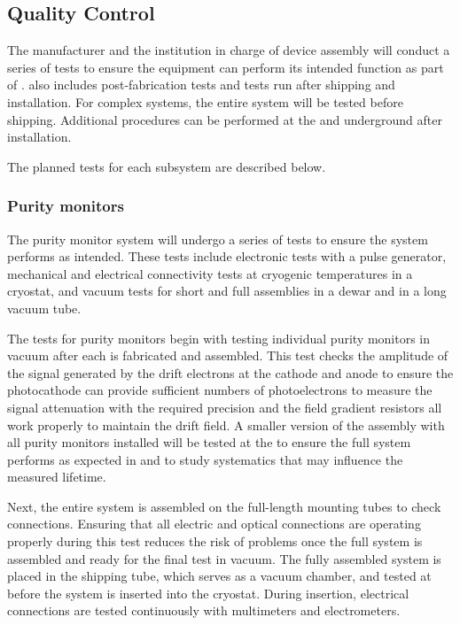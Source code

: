 \subsection{Quality Control}
\label{sec:fdsp-slow-cryo-qc}
The manufacturer and the institution in charge of device assembly will conduct a series of tests to ensure the equipment can perform its intended function as part of .  also includes post-fabrication tests and tests run after shipping and installation. For complex systems, the entire system will be tested before shipping. 
Additional  procedures can be performed at the  and underground after installation. %

The planned tests for each subsystem are described below.  


\subsubsection{Purity monitors}
\label{sec:fdgen-slow-cryo-qc-pm}


The purity monitor system will undergo a series of tests to ensure the
system performs as intended. These tests 
include electronic tests
with a pulse generator, mechanical and electrical connectivity tests
at cryogenic temperatures in a cryostat, and vacuum tests for short
and full assemblies in a dewar and in a long vacuum tube.

The  tests for  purity monitors begin with testing
individual purity monitors in vacuum after each is fabricated and
assembled.  This test checks the amplitude of the signal generated by
the drift electrons at the cathode and anode to ensure the
photocathode can provide sufficient numbers of photoelectrons to
measure the signal attenuation
with the required precision and the field gradient resistors all work properly to maintain the drift field. %
A smaller version of the assembly with all purity monitors installed will be tested at the 
to ensure the full system performs as expected in \lar and to study systematics that may influence the measured lifetime.

Next, %
the entire system %
is assembled on the full-length mounting tubes to check connections.  Ensuring that all electric and optical connections are operating properly during this test reduces the risk of problems once the full system is assembled and ready for the final test in vacuum.  %
The fully assembled system %
is placed in the shipping tube, which %
serves as a vacuum chamber, and tested at \surf %
 before the system is inserted into the  %
 cryostat. During insertion, electrical connections %
 are tested continuously with multimeters and electrometers. 


